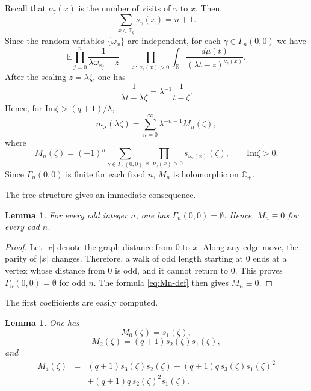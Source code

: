 \documentclass[a4paper,11pt]{article}
\newtheorem{lem}[thm]{Lemma}
\newcommand{\E}{\mathbb{E}}
\newcommand{\Impart}{\mathrm{Im}}
\begin{document}
Recall that $\nu_\gamma(x)$ is the number of visits of $\gamma$ to $x$.
Then,
$$
\sum_{x\in\mathbb T_q}\nu_\gamma(x)=n+1.
$$
Since the random variables $\{\omega_x\}$ are independent, for each
$\gamma\in\Gamma_n(0,0)$ we have
\begin{equation}
\label{eq:averaged-walk-weight}
\E\prod_{j=0}^{n}\frac{1}{\lambda\omega_{x_j}-z}
=
\prod_{x:\,\nu_\gamma(x)>0}
\int_{\mathbb R}
\frac{d\mu(t)}{(\lambda t-z)^{\nu_\gamma(x)}}.
\end{equation}
After the scaling $z=\lambda\zeta$, one has
$$
\frac{1}{\lambda t-\lambda\zeta}
=
\lambda^{-1}\frac{1}{t-\zeta}.
$$
Hence, for $\Impart \zeta>(q+1)/\lambda$,
\begin{equation}
\label{eq:scaled-series}
m_\lambda(\lambda\zeta)
=
\sum_{n=0}^{\infty}\lambda^{-n-1}M_n(\zeta),
\end{equation}
where
\begin{equation}
\label{eq:Mn-def}
M_n(\zeta)
=
(-1)^n
\sum_{\gamma\in\Gamma_n(0,0)}
\prod_{x:\,\nu_\gamma(x)>0}
s_{\nu_\gamma(x)}(\zeta),
\qquad
\Impart \zeta>0.
\end{equation}
Since $\Gamma_n(0,0)$ is finite for each fixed $n$, $M_n$ is
holomorphic on $\mathbb C_+$.

The tree structure gives an immediate consequence.

\begin{lem}
\label{lem:odd-vanish}
For every odd integer $n$, one has $\Gamma_n(0,0)=\emptyset$. 
Hence, $M_n\equiv0$ for every odd $n$.
\end{lem}

\begin{proof}
Let $|x|$ denote the graph distance from $0$ to $x$. 
Along any edge move, the parity of $|x|$ changes. 
Therefore, a walk of odd length starting at $0$ ends at a vertex whose distance from $0$ is odd, 
and it cannot return to $0$. 
This proves $\Gamma_n(0,0)=\emptyset$ for odd $n$. 
The formula \eqref{eq:Mn-def} then gives $M_n\equiv0$.
\end{proof}

The first coefficients are easily computed.

\begin{lem}
\label{lem:low-coefficients}
One has
\begin{equation}
\label{eq:M0-formula}
M_0(\zeta)=s_1(\zeta),
\end{equation}
\begin{equation}
\label{eq:M2-formula}
M_2(\zeta)=(q+1)s_2(\zeta)s_1(\zeta),
\end{equation}
and
\begin{eqnarray}
\label{eq:M4-formula}
M_4(\zeta)
&=&
(q+1)s_3(\zeta)s_2(\zeta)
+
(q+1)q\,s_3(\zeta)s_1(\zeta)^2
\nonumber\\
&&
+
(q+1)q\,s_2(\zeta)^2s_1(\zeta).
\end{eqnarray}
\end{lem}
\end{document}
